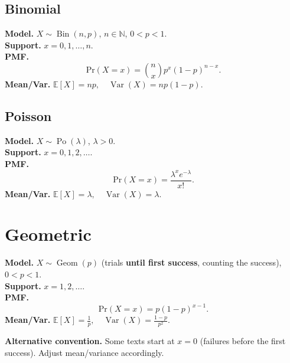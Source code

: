 \documentclass[
  letterpaper,
  DIV=11,
  numbers=noendperiod]{scrreprt}
\theoremstyle{definition}
\theoremstyle{plain}
\theoremstyle{definition}
\theoremstyle{remark}
\begin{document}
\subsection*{Binomial}\label{sec-binom}

\textbf{Model.} \(X \sim \operatorname{Bin}(n,p)\), \(n\in\mathbb{N}\),
\(0<p<1\).\\
\textbf{Support.} \(x=0,1,\ldots,n\).\\
\textbf{PMF.} \[
\mathrm{Pr}(X=x) = \binom{n}{x} p^x (1-p)^{n-x}.
\] \textbf{Mean/Var.}
\(\mathbb{E}[X]=np,\quad \operatorname{Var}(X)=np(1-p).\)

\subsection*{Poisson}\label{sec-pois}

\textbf{Model.} \(X \sim \operatorname{Po}(\lambda)\), \(\lambda>0\).\\
\textbf{Support.} \(x=0,1,2,\ldots\).\\
\textbf{PMF.} \[
\mathrm{Pr}(X=x)=\frac{\lambda^x e^{-\lambda}}{x!}.
\] \textbf{Mean/Var.}
\(\mathbb{E}[X]=\lambda,\quad \operatorname{Var}(X)=\lambda.\)

\section*{Geometric}\label{sec-geom}


\textbf{Model.} \(X \sim \operatorname{Geom}(p)\) (trials \textbf{until
first success}, counting the success), \(0<p<1\).\\
\textbf{Support.} \(x=1,2,\ldots\).\\
\textbf{PMF.} \[
\mathrm{Pr}(X=x)=p(1-p)^{x-1}.
\] \textbf{Mean/Var.}
\(\mathbb{E}[X]=\frac{1}{p},\quad \operatorname{Var}(X)=\frac{1-p}{p^2}.\)

\begin{tcolorbox}[enhanced jigsaw, left=2mm, toprule=.15mm, breakable, opacityback=0, titlerule=0mm, toptitle=1mm, colbacktitle=quarto-callout-tip-color!10!white, colframe=quarto-callout-tip-color-frame, coltitle=black, rightrule=.15mm, leftrule=.75mm, bottomrule=.15mm, arc=.35mm, bottomtitle=1mm, title=\textcolor{quarto-callout-tip-color}{\faLightbulb}\hspace{0.5em}{Tip}, colback=white, opacitybacktitle=0.6]

\textbf{Alternative convention.} Some texts start at \(x=0\) (failures
before the first success). Adjust mean/variance accordingly.

\end{tcolorbox}
\end{document}

